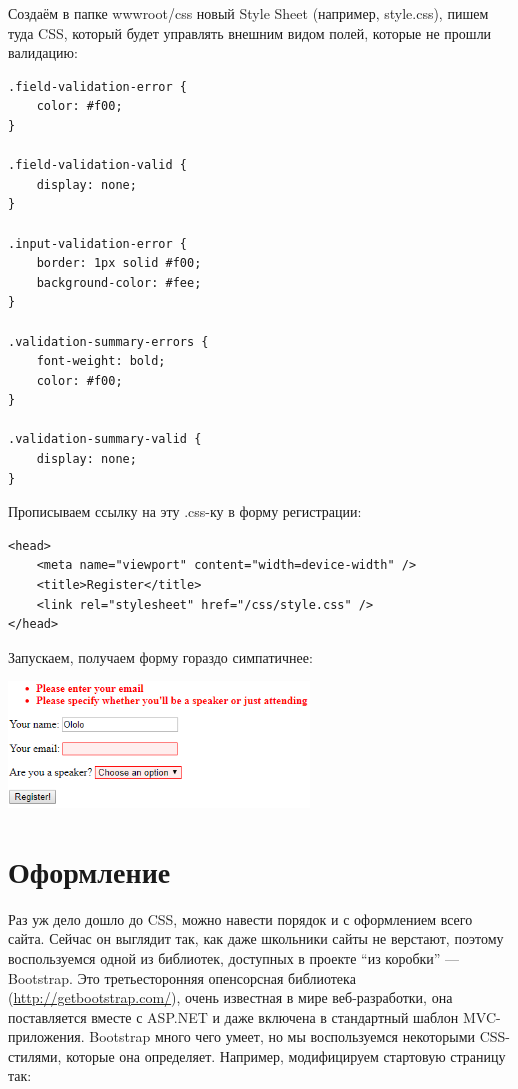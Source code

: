 \documentclass[a5paper]{article}
\begin{document}
Создаём в папке wwwroot/css новый Style Sheet (например, style.css), пишем туда CSS, который будет управлять внешним видом полей, которые не прошли валидацию:

\begin{verbatim}
.field-validation-error {
    color: #f00;
}

.field-validation-valid {
    display: none;
}

.input-validation-error {
    border: 1px solid #f00;
    background-color: #fee;
}

.validation-summary-errors {
    font-weight: bold;
    color: #f00;
}

.validation-summary-valid {
    display: none;
}
\end{verbatim}

Прописываем ссылку на эту .css-ку в форму регистрации:

\begin{verbatim}
<head>
    <meta name="viewport" content="width=device-width" />
    <title>Register</title>
    <link rel="stylesheet" href="/css/style.css" />
</head>
\end{verbatim}

Запускаем, получаем форму гораздо симпатичнее:

\begin{center}
	\includegraphics[width=0.6\textwidth]{validationErrorWithCss.png}
\end{center}

\section{Оформление}

Раз уж дело дошло до CSS, можно навести порядок и с оформлением всего сайта. Сейчас он выглядит так, как даже школьники сайты не верстают, поэтому воспользуемся одной из библиотек, доступных в проекте ``из коробки'' --- Bootstrap. Это третьесторонняя опенсорсная библиотека 
(\url{http://getbootstrap.com/}), очень известная в мире веб-разработки, она поставляется вместе с ASP.NET и даже включена в стандартный шаблон MVC-приложения. Bootstrap много чего умеет, но мы воспользуемся некоторыми CSS-стилями, которые она определяет. Например, модифицируем
стартовую страницу так:
\end{document}
